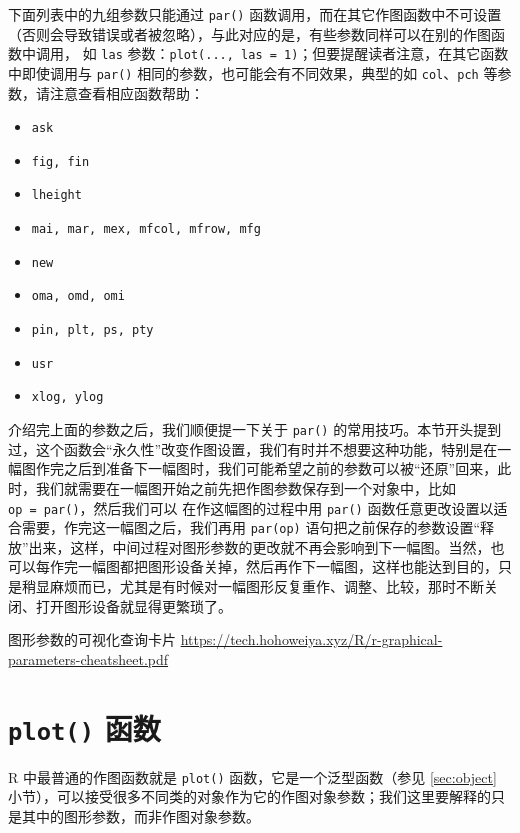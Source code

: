 \documentclass[
  b5paper,
  UTF8,twoside]{book}
\providecommand{\tightlist}{%
  \setlength{\itemsep}{0pt}\setlength{\parskip}{0pt}}
\begin{document}
下面列表中的九组参数只能通过 \texttt{par()} 函数调用，而在其它作图函数中不可设置（否则会导致错误或者被忽略），与此对应的是，有些参数同样可以在别的作图函数中调用， 如 \texttt{las} 参数：\texttt{plot(...,\ las\ =\ 1)}；但要提醒读者注意，在其它函数中即使调用与 \texttt{par()} 相同的参数，也可能会有不同效果，典型的如 \texttt{col}、\texttt{pch} 等参数，请注意查看相应函数帮助：

\begin{itemize}
\tightlist
\item
  \texttt{ask}
\item
  \texttt{fig,\ fin}
\item
  \texttt{lheight}
\item
  \texttt{mai,\ mar,\ mex,\ mfcol,\ mfrow,\ mfg}
\item
  \texttt{new}
\item
  \texttt{oma,\ omd,\ omi}
\item
  \texttt{pin,\ plt,\ ps,\ pty}
\item
  \texttt{usr}
\item
  \texttt{xlog,\ ylog}
\end{itemize}

介绍完上面的参数之后，我们顺便提一下关于 \texttt{par()} 的常用技巧。本节开头提到过，这个函数会``永久性''改变作图设置，我们有时并不想要这种功能，特别是在一幅图作完之后到准备下一幅图时，我们可能希望之前的参数可以被``还原''回来，此时，我们就需要在一幅图开始之前先把作图参数保存到一个对象中，比如 \texttt{op\ =\ par()}，然后我们可以 在作这幅图的过程中用 \texttt{par()} 函数任意更改设置以适合需要，作完这一幅图之后，我们再用 \texttt{par(op)} 语句把之前保存的参数设置``释放''出来，这样，中间过程对图形参数的更改就不再会影响到下一幅图。当然，也可以每作完一幅图都把图形设备关掉，然后再作下一幅图，这样也能达到目的，只是稍显麻烦而已，尤其是有时候对一幅图形反复重作、调整、比较，那时不断关闭、打开图形设备就显得更繁琐了。

图形参数的可视化查询卡片 \url{https://tech.hohoweiya.xyz/R/r-graphical-parameters-cheatsheet.pdf}

\hypertarget{sec:plot}{%
\section{\texorpdfstring{\texttt{plot()} 函数}{plot() 函数}}\label{sec:plot}}

R 中最普通的作图函数就是 \texttt{plot()} 函数，它是一个泛型函数（参见 \ref{sec:object} 小节），可以接受很多不同类的对象作为它的作图对象参数；我们这里要解释的只是其中的图形参数，而非作图对象参数。
\end{document}
